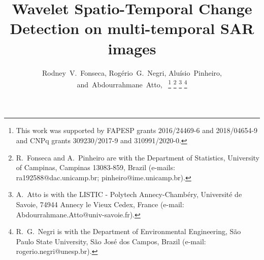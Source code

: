 \documentclass[journal]{IEEEtran}
\begin{document}
%
\title{Wavelet Spatio-Temporal Change Detection on multi-temporal SAR images}
%
%
%

\author{Rodney~V.~Fonseca, Rog\'{e}rio~G.~Negri,
        Alu\'{i}sio~Pinheiro,
        and~Abdourrahmane~Atto,~%
\thanks{This work was supported by FAPESP grants 2016/24469-6 and 2018/04654-9 and CNPq grants 309230/2017-9 and 310991/2020-0.}
\thanks{R.~Fonseca and A.~Pinheiro are with the Department of Statistics, University of Campinas, Campinas 13083-859, Brazil (e-mails: ra192588@dac.unicamp.br; pinheiro@ime.unicamp.br).}
\thanks{A.~Atto is with the LISTIC - Polytech Annecy-Chamb\'{e}ry, Universit\'{e} de Savoie, 74944 Annecy le Vieux Cedex, France (e-mail: Abdourrahmane.Atto@univ-savoie.fr).}
\thanks{R.~G.~Negri is with the Department of Environmental Engineering, São Paulo State University, São José dos Campos, Brazil (e-mail: rogerio.negri@unesp.br).}
}

% 
%
\end{document}

